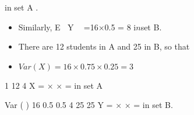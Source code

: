 \documentclass[a4paper,12pt]{article}
\begin{document}
\begin{enumerate}
in set A .

\begin{itemize}
\item Similarly, E Y  =16×0.5 = 8 i$n$set B.
\item There are 12 students in A and 25 in B, so that
\item $Var (X)  = 16 \times 0.75 \times 0.25 = 3$
\end{itemize}

 1
12 4
X = × × = in set A

Var ( ) 16 0.5 0.5 4
25 25
Y = × × = in set B.

\end{enumerate}
\end{document}
